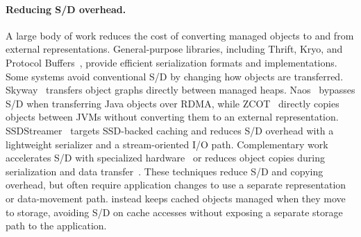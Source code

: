 \paragraph{\textbf{Reducing S/D overhead.}}
A large body of work reduces the cost of converting managed objects to and from external representations.
General-purpose libraries, including Thrift, Kryo, and Protocol Buffers~\cite{thrift,kryo,protocol-buffers}, provide efficient serialization formats and implementations.
Some systems avoid conventional S/D by changing how objects are transferred. Skyway~\cite{nguyen:skyway} transfers object graphs directly between managed heaps. Naos~\cite{taranov:naos} bypasses S/D when transferring Java objects over RDMA, while ZCOT~\cite{wu:zero_change} directly copies objects between JVMs without converting them to an external representation.
SSDStreamer~\cite{ssdstreamer} targets SSD-backed caching and reduces S/D overhead with a lightweight serializer and a stream-oriented I/O path.
Complementary work accelerates S/D with specialized hardware~\cite{jang:arch,pourhabibi:optimus} or reduces object copies during serialization and data transfer~\cite{matei:champions, ibanez:zerializer}. These techniques reduce S/D and copying overhead, but often require application changes to use a separate representation or data-movement path.
\chipperName{} instead keeps cached objects managed when they move to storage, avoiding S/D on cache accesses without exposing a separate storage path to the application.
